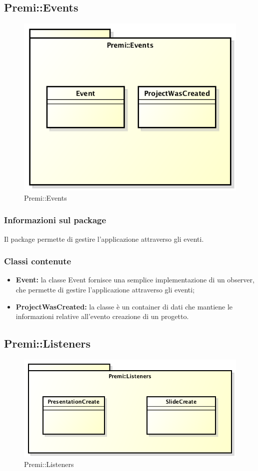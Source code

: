 \subsection{Premi::Events}
\begin{figure}[h]
	\centering
	\includegraphics[width=0.7\linewidth]{img/premi_events}
	\caption[Premi::Events]{Premi::Events}
	\label{fig:premi_events}
\end{figure}

\subsubsection*{Informazioni sul package}
Il package permette di gestire l'applicazione attraverso gli eventi.
\subsubsection*{Classi contenute}
\begin{itemize}
	\item \textbf{Event: }la classe Event fornisce una semplice implementazione di un observer, che permette di gestire l'applicazione attraverso gli eventi;
	\item \textbf{ProjectWasCreated: }la classe è un container di dati che mantiene le informazioni relative all'evento creazione di un progetto.
\end{itemize}

\newpage
\subsection{Premi::Listeners}
\begin{figure}[h]
	\centering
	\includegraphics[width=0.7\linewidth]{img/premi_listeners}
	\caption[Premi::Listeners]{Premi::Listeners}
	\label{fig:premi_listeners}
\end{figure}

